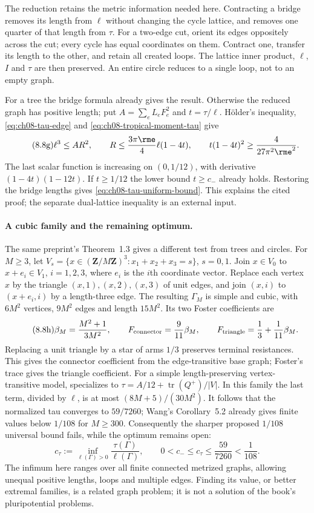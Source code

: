 The reduction retains the metric information needed here.
Contracting a bridge removes its length from $\ell$ without changing
the cycle lattice, and removes one quarter of that length from $\tau$.
For a two-edge cut, orient its edges oppositely across the cut; every
cycle has equal coordinates on them. Contract one, transfer its
length to the other, and retain all created loops. The lattice
inner product, $\ell$, $I$ and $\tau$ are then preserved.
An entire circle reduces to a single loop, not to an empty graph.

For a tree the bridge formula already gives the result. Otherwise the
reduced graph has positive length; put $A=\sum_eL_eF_e^2$ and
$t=\tau/\ell$. H\"older's inequality, \eqref{eq:ch08-tau-edge} and
\eqref{eq:ch08-tropical-moment-tau} give
\[\tag{8.8g}\label{eq:ch08-tau-scalar-bound}
 \ell^3\leq A R^2,\qquad
 R\leq\frac{3\pi\rme}4\ell(1-4t),\qquad
 t(1-4t)^2\geq\frac4{27\pi^2\rme^2}.
\]
The last scalar function is increasing on $(0,1/12)$, with
derivative $(1-4t)(1-12t)$. If $t\geq1/12$ the lower bound
$t\geq c_-$ already holds. Restoring the bridge lengths gives
\eqref{eq:ch08-tau-uniform-bound}. This explains the cited proof;
the separate dual-lattice inequality is an external input.

\paragraph{A cubic family and the remaining optimum.}
The same preprint's Theorem~1.3 gives a different test from trees
and circles. For $M\geq3$, let
$V_s=\{x\in(\mathbf Z/M\mathbf Z)^3:x_1+x_2+x_3=s\}$,
$s=0,1$. Join $x\in V_0$ to $x+e_i\in V_1$, $i=1,2,3$,
where $e_i$ is the $i$th coordinate vector. Replace each vertex $x$
by the triangle $(x,1),(x,2),(x,3)$ of unit edges, and join
$(x,i)$ to $(x+e_i,i)$ by a length-three edge. The resulting
$\Gamma_M$ is simple and cubic, with $6M^2$ vertices, $9M^2$ edges
and length $15M^2$. Its two Foster coefficients are
\[\tag{8.8h}\label{eq:ch08-tau-cubic-family}
 \beta_M=\frac{M^2+1}{3M^2},\qquad
 F_{\rm connector}=\frac9{11}\beta_M,\qquad
 F_{\rm triangle}=\frac13+\frac1{11}\beta_M.
\]
Replacing a unit triangle by a star of arms $1/3$ preserves terminal
resistances. This gives the connector coefficient from the
edge-transitive base graph; Foster's trace gives the triangle
coefficient. For a simple length-preserving vertex-transitive model,
\cite[Theorem~1.1]{Cinkir09DiscreteLaplacianV3} specializes to
$\tau=A/12+\operatorname{tr}(Q^+)/|V|$. In this family the last
term, divided by $\ell$, is at most $(8M+5)/(30M^2)$.
It follows that the normalized tau converges to $59/7260$;
Wang's Corollary~5.2 already gives finite values below $1/108$
for $M\geq300$. Consequently the sharper proposed $1/108$
universal bound fails, while the optimum remains open:
\[\tag{8.8i}\label{eq:ch08-tau-optimal-constant}
 c_\tau:=\inf_{\ell(\Gamma)>0}\frac{\tau(\Gamma)}{\ell(\Gamma)},
 \qquad 0<c_-\leq c_\tau\leq\frac{59}{7260}<\frac1{108}.
\]
The infimum here ranges over all finite connected metrized graphs,
allowing unequal positive lengths, loops and multiple edges.
Finding its value, or better extremal families, is a related graph
problem; it is not a solution of the book's pluripotential problems.

